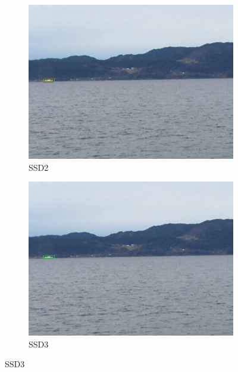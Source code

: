 \begin{figure}[h!]
\begin{subfigure}{.5\textwidth}
  \centering
  \includegraphics[width=0.8\linewidth]{results/case_buildings/ssdtrf/ssd2/2better/IMG_2262.jpg}
  \caption{SSD2}
\end{subfigure}%
\begin{subfigure}{.5\textwidth}
  \centering
  \includegraphics[width=.8\linewidth]{results/case_buildings/ssdtrf/ssd3/2better/IMG_2262.jpg}
  \caption{SSD3}
\end{subfigure}


\end{figure}

